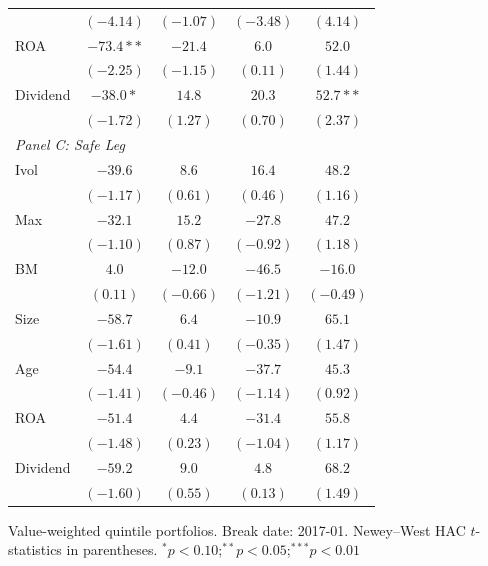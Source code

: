 \begin{table}[htbp]
\begin{tabular}{l c c c c}
 & $(-4.14)$ & $(-1.07)$ & $(-3.48)$ & $(4.14)$ \\
ROA & $-73.4**$ & $-21.4$ & $6.0$ & $52.0$ \\
 & $(-2.25)$ & $(-1.15)$ & $(0.11)$ & $(1.44)$ \\
Dividend & $-38.0*$ & $14.8$ & $20.3$ & $52.7**$ \\
 & $(-1.72)$ & $(1.27)$ & $(0.70)$ & $(2.37)$ \\
\midrule
\multicolumn{5}{l}{\textit{Panel C: Safe Leg}} \\
Ivol & $-39.6$ & $8.6$ & $16.4$ & $48.2$ \\
 & $(-1.17)$ & $(0.61)$ & $(0.46)$ & $(1.16)$ \\
Max & $-32.1$ & $15.2$ & $-27.8$ & $47.2$ \\
 & $(-1.10)$ & $(0.87)$ & $(-0.92)$ & $(1.18)$ \\
BM & $4.0$ & $-12.0$ & $-46.5$ & $-16.0$ \\
 & $(0.11)$ & $(-0.66)$ & $(-1.21)$ & $(-0.49)$ \\
Size & $-58.7$ & $6.4$ & $-10.9$ & $65.1$ \\
 & $(-1.61)$ & $(0.41)$ & $(-0.35)$ & $(1.47)$ \\
Age & $-54.4$ & $-9.1$ & $-37.7$ & $45.3$ \\
 & $(-1.41)$ & $(-0.46)$ & $(-1.14)$ & $(0.92)$ \\
ROA & $-51.4$ & $4.4$ & $-31.4$ & $55.8$ \\
 & $(-1.48)$ & $(0.23)$ & $(-1.04)$ & $(1.17)$ \\
Dividend & $-59.2$ & $9.0$ & $4.8$ & $68.2$ \\
 & $(-1.60)$ & $(0.55)$ & $(0.13)$ & $(1.49)$ \\
\bottomrule
\end{tabular}
\vspace{4pt}
\begin{minipage}{0.9\textwidth}
\footnotesize
Value-weighted quintile portfolios. Break date: 2017-01.
Newey--West HAC $t$-statistics in parentheses.
$^{*}p<0.10$;\quad $^{**}p<0.05$;\quad $^{***}p<0.01$
\end{minipage}
\end{table}
